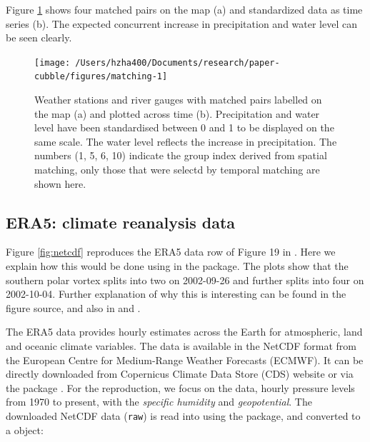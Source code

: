 \documentclass[
  shortnames]{jss}
\begin{document}
Figure \ref{fig:matching} shows four matched pairs on the map (a) and standardized data as time series (b). The expected concurrent increase in precipitation and water level can be seen clearly.

\begin{CodeChunk}
\begin{figure}

{\centering \texttt{[image: /Users/hzha400/Documents/research/paper-cubble/figures/matching-1]} 

}

\caption[Weather stations and river gauges with matched pairs labelled on the map (a) and plotted across time (b)]{Weather stations and river gauges with matched pairs labelled on the map (a) and plotted across time (b). Precipitation and water level have been standardised between 0 and 1 to be displayed on the same scale. The water level reflects the increase in precipitation. The numbers (1, 5, 6, 10) indicate the group index derived from spatial matching, only those that were selectd by temporal matching are shown here.}\label{fig:matching}
\end{figure}
\end{CodeChunk}

\hypertarget{era5-climate-reanalysis-data}{%
\subsection{ERA5: climate reanalysis data}\label{era5-climate-reanalysis-data}}

Figure \ref{fig:netcdf} reproduces the ERA5 data row of Figure 19 in \citet{hersbach2020era5}. Here we explain how this would be done using in the  package. The plots show that the southern polar vortex splits into two on 2002-09-26 and further splits into four on 2002-10-04. Further explanation of why this is interesting can be found in the figure source, and also in \citet{simmons2020global} and \citet{simmons2005ecmwf}.

The ERA5 data \citep{hersbach2020era5} provides hourly estimates across the Earth for atmospheric, land and oceanic climate variables. The data is available in the NetCDF format from the European Centre for Medium-Range Weather Forecasts (ECMWF). It can be directly downloaded from Copernicus Climate Data Store (CDS) \citep{cds} website or via the  package \citep{ecwmfr}. For the reproduction, we focus on the  data, hourly pressure levels from 1970 to present, with the \emph{specific humidity} and \emph{geopotential}. The downloaded NetCDF data (\texttt{raw}) is read into  using the  package, and converted to a  object:
\end{document}
